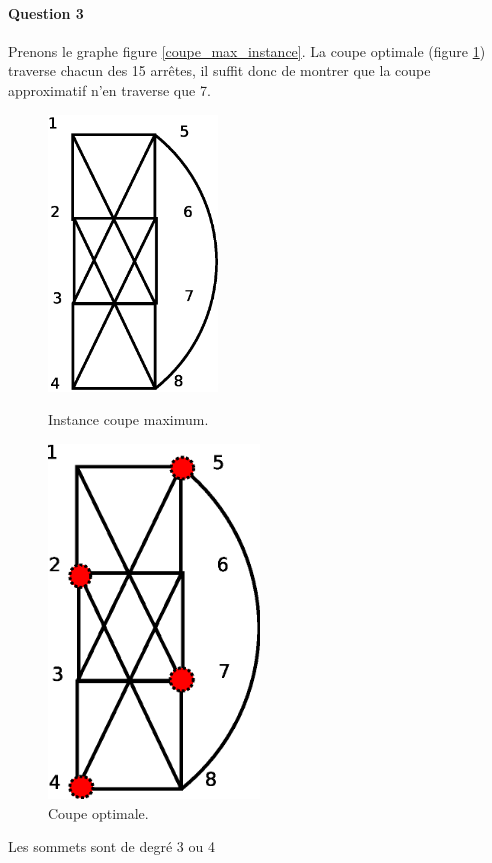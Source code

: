 \paragraph{Question 3}

Prenons le graphe figure \ref{coupe_max_instance}. La coupe optimale (figure \ref{coupe_max_opt}) traverse chacun des 15 arrêtes, il suffit donc de montrer que la coupe approximatif n'en traverse que 7. 

\begin{figure}[ht]
\begin{minipage}[b]{0.5\linewidth}
\centering
\centering
\includegraphics[width=0.4\textwidth]{../images/exo4.eps}
\caption{Instance coupe maximum.}
\label{coupe_max_instance}
\end{minipage}
\hspace{0.5cm}
\begin{minipage}[b]{0.4\linewidth}
\centering
\includegraphics[width=0.5\textwidth]{../images/exo4_opt.eps}
\caption{Coupe optimale.}
\label{coupe_max_opt}
\end{minipage}
\end{figure}

\begin{figure}[h!]

\end{figure}

Les sommets sont de degré 3 ou 4
